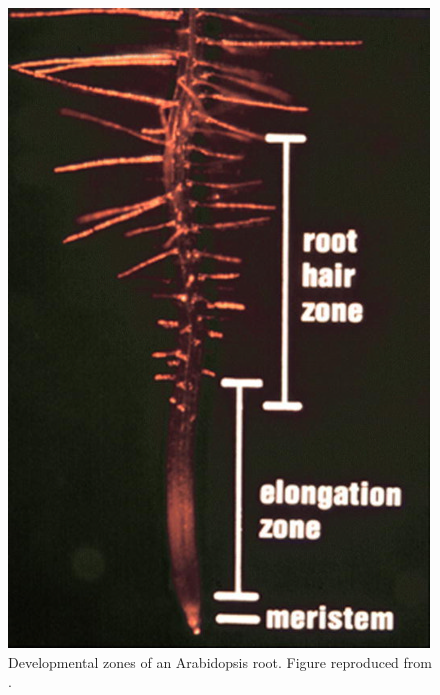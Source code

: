 \begin{figure}[t!]
\label{fig:multiRH02}
\end{figure}

\begin{figure}[t!]
	\centering
	\includegraphics[height=0.35\textheight]{fig01/devepzones}
	\caption{Developmental zones of an Arabidopsis root. Figure reproduced from \cite{griersonRH}.}
	\label{fig:RHP02}
\end{figure}

